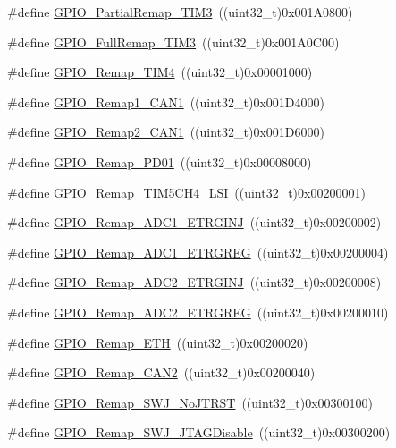 \begin{DoxyCompactItemize}
\#define \hyperlink{group__GPIO__Remap__define_gaaced3961a038fd8b41abfaf55d24f609}{GPIO\_\-PartialRemap\_\-TIM3}~((uint32\_\-t)0x001A0800)
\item 
\#define \hyperlink{group__GPIO__Remap__define_ga8ba8cef32c5076db1872e173f873dae6}{GPIO\_\-FullRemap\_\-TIM3}~((uint32\_\-t)0x001A0C00)
\item 
\#define \hyperlink{group__GPIO__Remap__define_ga041b2f02b32895ce34bcd7499c9e873f}{GPIO\_\-Remap\_\-TIM4}~((uint32\_\-t)0x00001000)
\item 
\#define \hyperlink{group__GPIO__Remap__define_ga89ac81224968d8faf42475be664c1e09}{GPIO\_\-Remap1\_\-CAN1}~((uint32\_\-t)0x001D4000)
\item 
\#define \hyperlink{group__GPIO__Remap__define_gad4f5b46cf24bed1563b22e6ecca3ebef}{GPIO\_\-Remap2\_\-CAN1}~((uint32\_\-t)0x001D6000)
\item 
\#define \hyperlink{group__GPIO__Remap__define_gaeac44191de99d55a5fa03e29b74d5e59}{GPIO\_\-Remap\_\-PD01}~((uint32\_\-t)0x00008000)
\item 
\#define \hyperlink{group__GPIO__Remap__define_gad909488d0b7a0cfa1116a66e962e3c62}{GPIO\_\-Remap\_\-TIM5CH4\_\-LSI}~((uint32\_\-t)0x00200001)
\item 
\#define \hyperlink{group__GPIO__Remap__define_gaf79d966f49b64d3feb0ba9cc39294dac}{GPIO\_\-Remap\_\-ADC1\_\-ETRGINJ}~((uint32\_\-t)0x00200002)
\item 
\#define \hyperlink{group__GPIO__Remap__define_gab1d040cab5d9f16f362edc2e8b47a82a}{GPIO\_\-Remap\_\-ADC1\_\-ETRGREG}~((uint32\_\-t)0x00200004)
\item 
\#define \hyperlink{group__GPIO__Remap__define_gae00aaabeed54e805932ec6978acf000d}{GPIO\_\-Remap\_\-ADC2\_\-ETRGINJ}~((uint32\_\-t)0x00200008)
\item 
\#define \hyperlink{group__GPIO__Remap__define_gaa782a0c482f34507c82e4cd639bb747e}{GPIO\_\-Remap\_\-ADC2\_\-ETRGREG}~((uint32\_\-t)0x00200010)
\item 
\#define \hyperlink{group__GPIO__Remap__define_gaf578688bb4d1a17fb3a103946e7c2eb7}{GPIO\_\-Remap\_\-ETH}~((uint32\_\-t)0x00200020)
\item 
\#define \hyperlink{group__GPIO__Remap__define_ga14c09a5050063b703fa07181afc56ee6}{GPIO\_\-Remap\_\-CAN2}~((uint32\_\-t)0x00200040)
\item 
\#define \hyperlink{group__GPIO__Remap__define_ga81009ef35f7f039365291cf4f6fc0c5b}{GPIO\_\-Remap\_\-SWJ\_\-NoJTRST}~((uint32\_\-t)0x00300100)
\item 
\#define \hyperlink{group__GPIO__Remap__define_ga25fb8c789334694861444e48f486879d}{GPIO\_\-Remap\_\-SWJ\_\-JTAGDisable}~((uint32\_\-t)0x00300200)

\end{DoxyCompactItemize}
